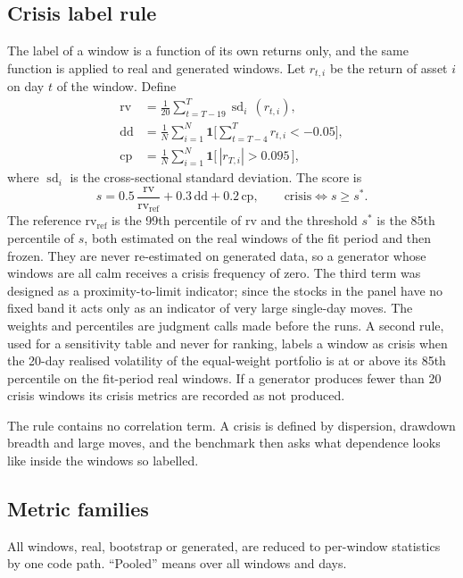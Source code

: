 \documentclass[journal]{IEEEtran}
\begin{document}
\subsection{Crisis label rule}
\label{sec:label}
The label of a window is a function of its own returns only, and the same function is applied to real and
generated windows. Let $r_{t,i}$ be the return of asset $i$ on day $t$ of the window. Define
\begin{align}
\mathrm{rv} &= \frac{1}{20}\sum_{t=T-19}^{T} \operatorname{sd}_i\,(r_{t,i}), \\
\mathrm{dd} &= \frac{1}{N}\sum_{i=1}^{N} \mathbf{1}\Big[\sum_{t=T-4}^{T} r_{t,i} < -0.05\Big], \\
\mathrm{cp} &= \frac{1}{N}\sum_{i=1}^{N} \mathbf{1}\big[\,|r_{T,i}| > 0.095\,\big],
\end{align}
where $\operatorname{sd}_i$ is the cross-sectional standard deviation. The score is
\begin{equation}
s = 0.5\,\frac{\mathrm{rv}}{\mathrm{rv}_{\mathrm{ref}}} + 0.3\,\mathrm{dd} + 0.2\,\mathrm{cp},
\qquad \text{crisis} \iff s \ge s^{\ast}.
\label{eq:score}
\end{equation}
The reference $\mathrm{rv}_{\mathrm{ref}}$ is the 99th percentile of $\mathrm{rv}$ and the threshold $s^{\ast}$
is the 85th percentile of $s$, both estimated on the real windows of the fit period and then frozen. They are
never re-estimated on generated data, so a generator whose windows are all calm receives a crisis frequency of
zero. The third term was designed as a proximity-to-limit indicator; since the stocks in the panel have no
fixed band it acts only as an indicator of very large single-day moves. The weights and percentiles are
judgment calls made before the runs. A second rule, used for a sensitivity table and never for ranking, labels
a window as crisis when the 20-day realised volatility of the equal-weight portfolio is at or above its 85th
percentile on the fit-period real windows. If a generator produces fewer than 20 crisis windows its crisis
metrics are recorded as not produced.

The rule contains no correlation term. A crisis is defined by dispersion, drawdown breadth and large moves, and
the benchmark then asks what dependence looks like inside the windows so labelled.

\subsection{Metric families}
\label{sec:metrics}
All windows, real, bootstrap or generated, are reduced to per-window statistics by one code path. ``Pooled''
means over all windows and days.
\end{document}
